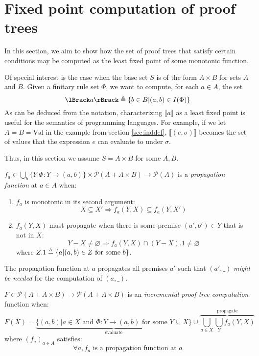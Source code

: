 \documentclass[12pt]{article}
\begin{document}
\section{Fixed point computation of proof trees}
In this section, we aim to show how the set of proof trees that satisfy certain conditions may be computed as the least fixed point of some monotonic function.

Of special interest is the case when the base set $S$ is of the form $A\times B$ for sets $A$ and $B$.
Given a finitary rule set $\Phi$, we want to compute, for each $a\in A$, the set
\[\lBrack a\rBrack\defeq\{b\in B|(a,b)\in I(\Phi)\}\]
As can be deduced from the notation, characterizing $\lBrack a\rBrack$ as a least fixed point is useful for the semantics of programming languages.
For example, if we let $A=B=\text{Val}$ in the example from section \ref{sec:inddef}, $\lBrack (e,\sigma)\rBrack$ becomes the set of values that the expression $e$ can evaluate to under $\sigma$.

Thus, in this section we assume $S=A\times B$ for some $A,B$.
\begin{definition}\label{def:propagation}
	$f_a\in\bigcup_b\{Y|\Phi:Y\rightarrow(a,b)\}\times\mathcal{P}(A+A\times B)\rightarrow\mathcal{P}(A)$ is a \emph{propagation function} at $a\in A$ when:
	\begin{enumerate}
		\item $f_a$ is monotonic in its second argument:
		      \[X\subseteq X'\Rightarrow f_a(Y,X)\subseteq f_a(Y,X')\]
		\item $f_a(Y,X)$ must propagate when there is some premise $(a',b')\in Y$ that is not in $X$:
		      \[Y-X\neq\varnothing\Rightarrow f_a(Y,X)\cap(Y-X).1\neq\varnothing\]
		      where $Z.1\triangleq\{a|(a,b)\in Z\text{ for some }b\}$.
	\end{enumerate}
\end{definition}

The propagation function at $a$ propagates all premises $a'$ such that $(a',\_)$ \emph{might be needed} for the computation of $(a,\_)$.

\begin{definition}
	$F\in\mathcal{P}(A+A\times B)\rightarrow\mathcal{P}(A+A\times B)$ is an \emph{incremental proof tree computation} function when:
	\[F(X)=\underbrace{\{(a,b)|a\in X\text{ and }\Phi:Y\rightarrow(a,b)\text{ for some }Y\subseteq X\}}_{\text{evaluate}}\cup\overbrace{\bigcup_{a\in X}\bigcup_{Y}f_a(Y,X)}^{\text{propagate}}\]
	where $(f_a)_{a\in A}$ satisfies:
	\[\forall a,f_a\text{ is a propagation function at }a\]
\end{definition}
\end{document}
